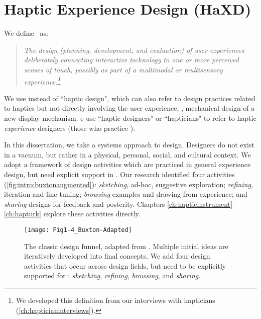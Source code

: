 \section{Haptic Experience Design (HaXD)}
We define \haxd\ as: %
\begin{quote}
\it The design (planning, development, and evaluation) of user experiences  deliberately connecting interactive technology to
one or more perceived senses of touch, possibly as part of a multimodal or multisensory experience.\footnote{We developed this definition from our interviews with hapticians (\autoref{ch:hapticianinterviews}).}
\end{quote}
We use \haxd instead of ``haptic design", which can also refer to design practices related to haptics but not directly involving the user experience, \eg, mechanical design of a new display mechanism. %
e use ``haptic designers" or ``hapticians" to refer to haptic \emph{experience} designers (those who practice \haxd).

In this dissertation, we take a systems approach to design.
Designers do not exist in a vacuum, but rather in a physical, personal, social, and cultural context. %
We adopt a framework of design activities which are practiced in general experience design, but need explicit support in \haxd.
Our research identified four activities (\autoref{fig:intro:buxtonaugmented}): \emph{sketching}, ad-hoc, suggestive exploration; \emph{refining}, iteration and fine-tuning; \emph{browsing} examples and drawing from experience; and \emph{sharing} designs for feedback and posterity.
Chapters \ref{ch:hapticinstrument}-\ref{ch:hapturk} explore these activities directly. %





\begin{figure}[htbp] %
   \centering
   \texttt{[image: Fig1-4\_Buxton-Adapted]} 
   \caption{The classic design funnel, adapted from \citet{Buxton2007}.
   Multiple initial ideas are iteratively developed into final concepts.
   We add four design activities that occur across design fields, but need to be explicitly supported for \haxd: \textit{sketching}, \textit{refining}, \textit{browsing}, and \textit{sharing}.}
   \label{fig:intro:buxtonaugmented}
\end{figure}





